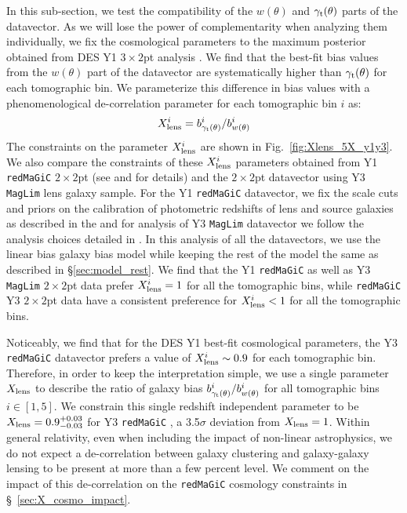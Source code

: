 \documentclass[aps, prd,twocolumn,superscriptaddress,nofootinbib,preprintnumbers]{revtex4-1}
\newcommand{\gammat}{\ensuremath{\gamma_{\rm t}(\theta)}}
\newcommand{\wtheta}{\ensuremath{w(\theta)}}
\newcommand{\redmagic}{\texttt{redMaGiC} }
\newcommand{\maglim}{\texttt{MagLim} }
\begin{document}
In this sub-section, we test the compatibility of the $\wtheta$ and $\gammat$ parts of the datavector. As we will lose the power of complementarity when analyzing them individually, we fix the cosmological parameters to the maximum posterior obtained from DES Y1 $3\times 2$pt analysis \citep{Abbott_2018}. We find that the best-fit bias values from the $\wtheta$ part of the datavector are systematically higher than $\gammat$ for each tomographic bin. We parameterize this difference in bias values with a phenomenological de-correlation parameter for each tomographic bin $i$ as:
\begin{equation}
    X^{i}_{\rm lens} = b^i_{\gammat}/b^i_{\wtheta}
\end{equation}
The constraints on the parameter $X^{i}_{\rm lens}$ are shown in Fig.~\ref{fig:Xlens_5X_y1y3}. We also compare the constraints of these $X^{i}_{\rm lens}$ parameters obtained from Y1 \redmagic $2 \times 2$pt (see \citealt{Abbott_2018} and \citealt{gglpaper} for details) and the $2 \times 2$pt datavector using Y3 \maglim lens galaxy sample. For the Y1 \redmagic datavector,  we fix the scale cuts and priors on the calibration of photometric redshifts of lens and source galaxies as described in the \citet{Abbott_2018} and for analysis of Y3 \maglim datavector we follow the analysis choices detailed in \citet*{y3-2x2ptaltlensresults}. In this analysis of all the datavectors, we use the linear bias galaxy bias model while keeping the rest of the model the same as described in \S\ref{sec:model_rest}. We find that the Y1 \redmagic as well as Y3 \maglim $2\times 2$pt data prefer $X^{i}_{\rm lens} = 1$ for all the tomographic bins, while \redmagic Y3 $2\times 2$pt data have a consistent preference for $X^{i}_{\rm lens} < 1$ for all the tomographic bins.

Noticeably, we find that for the DES Y1 best-fit cosmological parameters, the Y3 \redmagic datavector prefers a value of $X^{i}_{\rm lens} \sim 0.9$ for each tomographic bin. Therefore, in order to keep the interpretation simple, we use a single parameter $X_{\rm lens}$ to describe the ratio of galaxy bias $b^i_{\gammat}/b^i_{\wtheta}$ for all tomographic bins $ i \in [1,5]$. We constrain this single redshift independent parameter to be $X_{\rm lens} = 0.9^{+0.03}_{-0.03}$ for Y3 \redmagic, a 3.5$\sigma$ deviation from $X_{\rm lens} = 1$. Within general relativity, even when including the impact of non-linear astrophysics, we do not expect a de-correlation between galaxy clustering and galaxy-galaxy lensing to be present at more than a few percent level. We comment on the impact of this de-correlation on the \redmagic cosmology constraints in \S~\ref{sec:X_cosmo_impact}. 
\end{document}
